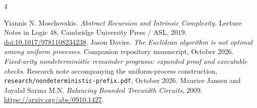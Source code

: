 \documentclass[11pt]{article}
\begin{document}
\begin{thebibliography}{4}\raggedright
{}
Yiannis N. Moschovakis.
\emph{Abstract Recursion and Intrinsic Complexity}.
Lecture Notes in Logic 48, Cambridge University Press / ASL, 2019.
\href{https://doi.org/10.1017/9781108234238}{doi:10.1017/9781108234238}.
Jason Davies.
\emph{The Euclidean algorithm is not optimal among uniform processes}.
Companion repository manuscript, October 2026.
\emph{Fixed-arity nondeterministic remainder programs: expanded proof and
executable checks}.
Research note accompanying the uniform-process construction,
\nolinkurl{research/nondeterministic-prefix.pdf}, October 2026.
Maurice Jansen and Jayalal Sarma M.N.
\emph{Balancing Bounded Treewidth Circuits}, 2009.
\url{https://arxiv.org/abs/0910.1427}.
\end{thebibliography}
\end{document}
